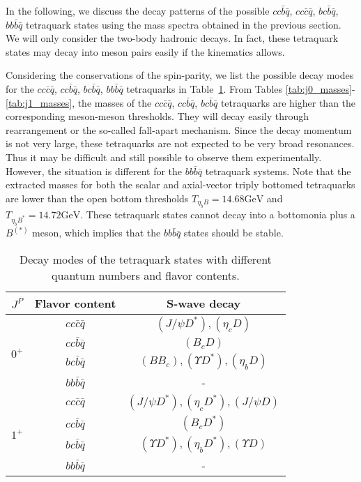 \documentclass[prd,showpacs,showkeys,floatfix,amsmath,amssymb,floatfix,english]{revtex4}
\begin{document}
In the following, we discuss the decay patterns of the possible
$cc\bar{b}\bar{q}$, $cc\bar{c}\bar{q}$, $bc\bar{b}\bar{q}$,
$bb\bar{b}\bar{q}$ tetraquark states using the mass spectra obtained
in the previous section. We will only consider the two-body hadronic
decays. In fact, these tetraquark states may decay into meson pairs
easily if the kinematics allows.

Considering the conservations of the spin-parity, we list the
possible decay modes for the $cc\bar{c}\bar{q}$, $cc\bar{b}\bar{q}$,
$bc\bar{b}\bar{q}$, $bb\bar{b}\bar{q}$ tetraquarks in
Table~\ref{tab:Decay-modes}. From Tables
\ref{tab:j0_masses}-\ref{tab:j1_masses}, the masses of the
$cc\bar{c}\bar{q}$, $cc\bar{b}\bar{q}$, $bc\bar{b}\bar{q}$
tetraquarks are higher than the corresponding meson-meson
thresholds. They will decay easily through rearrangement or the
so-called fall-apart mechanism. Since the decay momentum is not very
large, these tetraquarks are not expected to be very broad
resonances. Thus it may be difficult and still possible to observe
them experimentally. However, the situation is different for the
$bb\bar{b}\bar{q}$ tetraquark systems. Note that the extracted
masses for both the scalar and axial-vector triply bottomed
tetraquarks are lower than the open bottom thresholds
$T_{\eta_{b}B}=14.68\mathrm{GeV}$ and
$T_{\eta_{b}B^{*}}=14.72\mathrm{GeV}$. These tetraquark states
cannot decay into a bottomonia plus a $B^{(*)}$ meson, which implies
that the $bb\bar{b}\bar{q}$ states should be stable.


\begin{center}
\begin{table}
\begin{centering}
\begin{tabular}{|c|c|c|}
\hline $J^{P}$ & Flavor content & S-wave decay\tabularnewline \hline
\multirow{4}{*}{$0^{+}$} & $cc\bar{c}\bar{q}$ & $\left(J/\psi
D^{*}\right),\left(\eta_{c}D\right)$\tabularnewline \cline{2-3}
 & $cc\bar{b}\bar{q}$ & $\left(B_{c}D\right)$\tabularnewline
\cline{2-3}
 & $bc\bar{b}\bar{q}$ & $\left(BB_{c}\right),\left(\varUpsilon D^{*}\right),\left(\eta_{b}D\right)$\tabularnewline
\cline{2-3}
 & $bb\bar{b}\bar{q}$ & -\tabularnewline
\hline \multirow{4}{*}{$1^{+}$} & $cc\bar{c}\bar{q}$ & $\left(J/\psi
D^{*}\right),\left(\eta_{c}D^{*}\right),\left(J/\psi
D\right)$\tabularnewline \cline{2-3}
 & $cc\bar{b}\bar{q}$ & $\left(B_{c}D^{*}\right)$\tabularnewline
\cline{2-3}
 & $bc\bar{b}\bar{q}$ & $\left(\varUpsilon D^{*}\right),\left(\eta_{b}D^{*}\right),\left(\varUpsilon D\right)$\tabularnewline
\cline{2-3}
 & $bb\bar{b}\bar{q}$ & -\tabularnewline
\hline
\end{tabular}
\par\end{centering}
\caption{\label{tab:Decay-modes}Decay modes of the tetraquark states
with different quantum numbers and flavor contents.}
\end{table}
\par\end{center}
\end{document}

